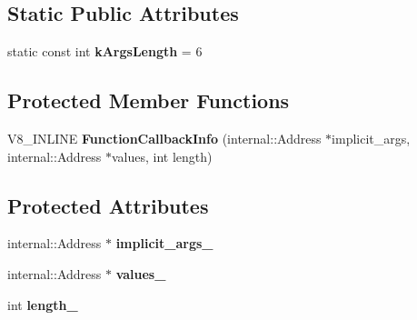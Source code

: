 \subsection*{Static Public Attributes}
\begin{DoxyCompactItemize}
\item 
\mbox{\label{classv8_1_1FunctionCallbackInfo_a1e5248c2d40840270829882feaaa9d34}} 
static const int {\bfseries k\+Args\+Length} = 6
\end{DoxyCompactItemize}
\subsection*{Protected Member Functions}
\begin{DoxyCompactItemize}
\item 
\mbox{\label{classv8_1_1FunctionCallbackInfo_a34ca4a2f13fa2479a340d5cfd8efaca1}} 
V8\+\_\+\+I\+N\+L\+I\+NE {\bfseries Function\+Callback\+Info} (internal\+::\+Address $\ast$implicit\+\_\+args, internal\+::\+Address $\ast$values, int length)
\end{DoxyCompactItemize}
\subsection*{Protected Attributes}
\begin{DoxyCompactItemize}
\item 
\mbox{\label{classv8_1_1FunctionCallbackInfo_a589fda1e686768fb49af5f5ea9e6549e}} 
internal\+::\+Address $\ast$ {\bfseries implicit\+\_\+args\+\_\+}
\item 
\mbox{\label{classv8_1_1FunctionCallbackInfo_a1692383567930ec69c51ddfd9207744e}} 
internal\+::\+Address $\ast$ {\bfseries values\+\_\+}
\item 
\mbox{\label{classv8_1_1FunctionCallbackInfo_ab250ace06b495beb6f14b192eff77005}} 
int {\bfseries length\+\_\+}
\end{DoxyCompactItemize}
